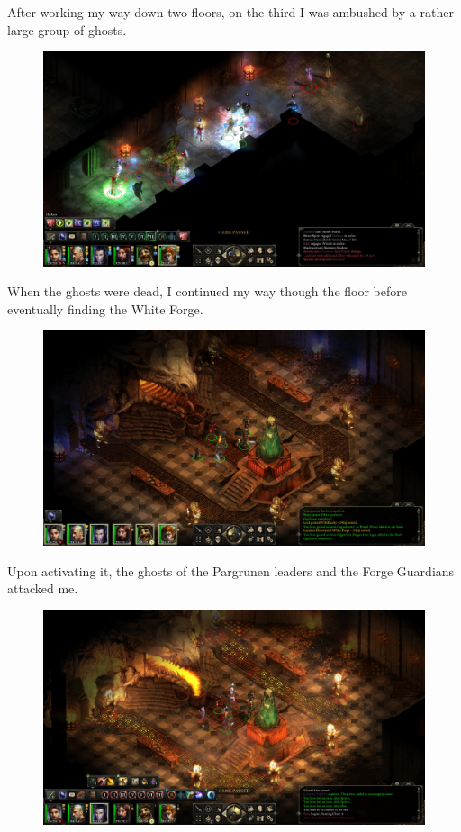 \documentclass{article}
\begin{document}
After working my way down two floors, on the third I was ambushed by a rather large group of ghosts.

\begin{figure}
\includegraphics[scale=0.33]{files/blog/2019_08_17_poe_potd_wmpt1/2019_08_17_durgans_battery_05.jpg}
\end{figure}

When the ghosts were dead, I continued my way though the floor before eventually finding the White Forge.

\begin{figure}
\includegraphics[scale=0.33]{files/blog/2019_08_17_poe_potd_wmpt1/2019_08_17_durgans_battery_06.jpg}
\end{figure}

Upon activating it, the ghosts of the Pargrunen leaders and the Forge Guardians attacked me.

\begin{figure}
\includegraphics[scale=0.33]{files/blog/2019_08_17_poe_potd_wmpt1/2019_08_17_durgans_battery_07.jpg}
\end{figure}
\end{document}
